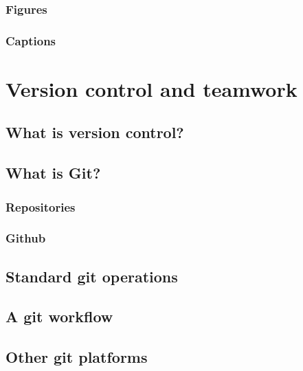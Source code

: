 \documentclass[
]{book}
\begin{document}
\hypertarget{figures}{%
\section{Figures}\label{figures}}

\hypertarget{captions}{%
\section{Captions}\label{captions}}

\hypertarget{part-version-control-and-teamwork}{%
\part{Version control and teamwork}\label{part-version-control-and-teamwork}}

\hypertarget{what-is-version-control}{%
\chapter{What is version control?}\label{what-is-version-control}}

\hypertarget{what-is-git}{%
\chapter{What is Git?}\label{what-is-git}}

\hypertarget{repositories}{%
\section{Repositories}\label{repositories}}

\hypertarget{github}{%
\section{Github}\label{github}}

\hypertarget{standard-git-operations}{%
\chapter{Standard git operations}\label{standard-git-operations}}

\hypertarget{a-git-workflow}{%
\chapter{A git workflow}\label{a-git-workflow}}

\hypertarget{other-git-platforms}{%
\chapter{Other git platforms}\label{other-git-platforms}}
\end{document}
